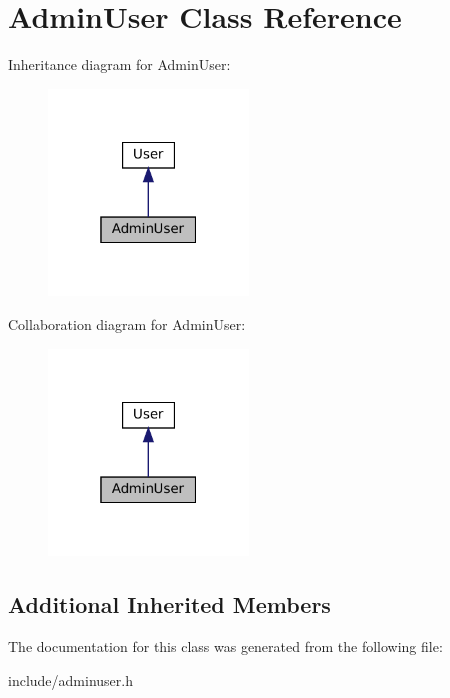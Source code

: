\hypertarget{classAdminUser}{}\section{Admin\+User Class Reference}
\label{classAdminUser}


Inheritance diagram for Admin\+User\+:\nopagebreak
\begin{figure}[H]
\begin{center}
\leavevmode
\includegraphics[width=151pt]{classAdminUser__inherit__graph}
\end{center}
\end{figure}


Collaboration diagram for Admin\+User\+:\nopagebreak
\begin{figure}[H]
\begin{center}
\leavevmode
\includegraphics[width=151pt]{classAdminUser__coll__graph}
\end{center}
\end{figure}
\subsection*{Additional Inherited Members}


The documentation for this class was generated from the following file\+:\begin{DoxyCompactItemize}
\item 
include/adminuser.\+h\end{DoxyCompactItemize}
